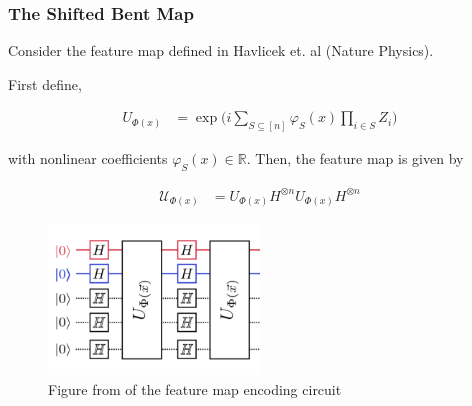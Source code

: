 \documentclass{beamer}
\newcommand\0{\mathbf{0}}
\newcommand\RR{\mathbb{R}}
\newcommand\<{\langle}
\renewcommand\>{\rangle}
\renewcommand\phi{\varphi}
\begin{document}
\begin{frame}	

\frametitle{The Shifted Bent Map}

Consider the feature map defined in Havlicek et. al (Nature Physics).

First define,

\begin{align}
\label{eq:diagonal-feat}
U_{\Phi(x)} &= \exp\Big(i \sum_{S \subseteq [n]} \phi_S(x) \prod_{i \in S} Z_i \Big)	
\end{align}

with nonlinear coefficients $\phi_S(x) \in \RR$. Then, the feature map is given by 


\begin{align}
\label{feat-map:hav}
\mathcal{U}_{\Phi(x)} &= U_{\Phi(x)} H^{\otimes n} U_{\Phi(x)} H^{\otimes n}
\end{align}

\begin{figure}[H]
\centering
\includegraphics[width=0.5\textwidth]{images/feature_map_circuit}
\caption{Figure from \cite{havlicek2018supervised} of the feature map encoding circuit}
\end{figure}
\end{frame}
\end{document}
